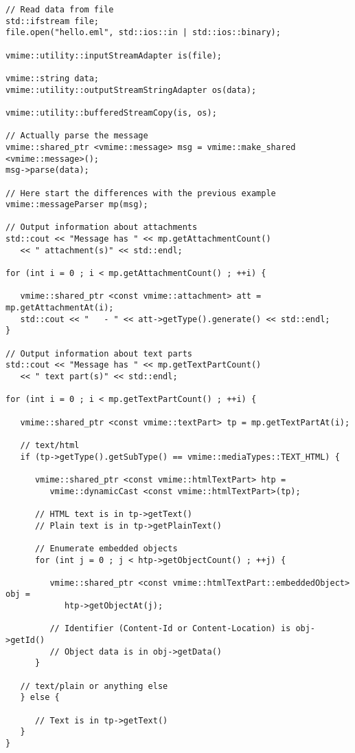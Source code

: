 \begin{lstlisting}[caption={Using {\vcode vmime::messageParser} to parse
more complex messages}]
// Read data from file
std::ifstream file;
file.open("hello.eml", std::ios::in | std::ios::binary);

vmime::utility::inputStreamAdapter is(file);

vmime::string data;
vmime::utility::outputStreamStringAdapter os(data);

vmime::utility::bufferedStreamCopy(is, os);

// Actually parse the message
vmime::shared_ptr <vmime::message> msg = vmime::make_shared <vmime::message>();
msg->parse(data);

// Here start the differences with the previous example
vmime::messageParser mp(msg);

// Output information about attachments
std::cout << "Message has " << mp.getAttachmentCount()
   << " attachment(s)" << std::endl;

for (int i = 0 ; i < mp.getAttachmentCount() ; ++i) {

   vmime::shared_ptr <const vmime::attachment> att = mp.getAttachmentAt(i);
   std::cout << "   - " << att->getType().generate() << std::endl;
}

// Output information about text parts
std::cout << "Message has " << mp.getTextPartCount()
   << " text part(s)" << std::endl;

for (int i = 0 ; i < mp.getTextPartCount() ; ++i) {

   vmime::shared_ptr <const vmime::textPart> tp = mp.getTextPartAt(i);

   // text/html
   if (tp->getType().getSubType() == vmime::mediaTypes::TEXT_HTML) {

      vmime::shared_ptr <const vmime::htmlTextPart> htp =
         vmime::dynamicCast <const vmime::htmlTextPart>(tp);

      // HTML text is in tp->getText()
      // Plain text is in tp->getPlainText()

      // Enumerate embedded objects
      for (int j = 0 ; j < htp->getObjectCount() ; ++j) {

         vmime::shared_ptr <const vmime::htmlTextPart::embeddedObject> obj =
            htp->getObjectAt(j);

         // Identifier (Content-Id or Content-Location) is obj->getId()
         // Object data is in obj->getData()
      }

   // text/plain or anything else
   } else {

      // Text is in tp->getText()
   }
}
\end{lstlisting}


